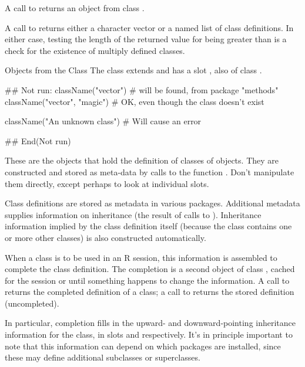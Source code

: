 %
\begin{Value}
A call to  returns an object from class
.

A call to  returns either a character
vector or a named list of class definitions.  In either case, testing
the length of the returned value for being greater than  is a
check for the existence of multiply defined classes.
\end{Value}
%
\begin{Section}{Objects from the Class}
The class  extends  and has a slot
, also of class .
\end{Section}
%
\begin{Examples}
\begin{ExampleCode}
## Not run: 
className("vector") # will be found, from package "methods"
className("vector", "magic") # OK, even though the class doesn't exist


className("An unknown class") # Will cause an error

## End(Not run)
\end{ExampleCode}
\end{Examples}
%
\begin{Description}\relax
  These are the objects that hold the definition of
classes of objects.  They are constructed and stored as meta-data by
calls to the function .  Don't manipulate them
directly, except perhaps to look at individual slots. 
\end{Description}
%
\begin{Details}\relax
Class definitions are stored as metadata in various packages.
Additional metadata supplies information on inheritance (the result of
calls to ).  Inheritance information implied by the
class definition itself (because the class contains one or more other
classes) is also constructed automatically.

When a class is to be used in an R session, this information is
assembled to complete the class definition.  The completion is a
second object of class , cached for the
session or until something happens to change the information.  A call
to  returns the completed definition of a class;
a call to  returns the stored definition
(uncompleted).

In particular, completion fills in the upward- and downward-pointing
inheritance information for the class, in slots  and
 respectively.  It's in principle important to note
that this information can depend on which packages are installed,
since these may define additional subclasses or superclasses.
\end{Details}
